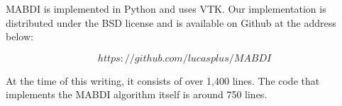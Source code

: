MABDI is implemented in Python and uses VTK. Our implementation is distributed
under the BSD license and is available on Github at the address below:

$$
https://github.com/lucasplus/MABDI
$$

At the time of this writing, it consists of over 1,400 lines. The code that
implements the MABDI algorithm itself is around 750 lines.
